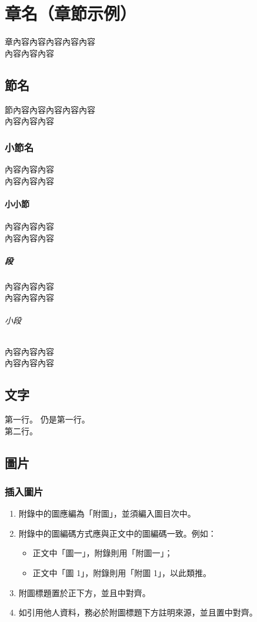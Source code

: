 
\chapter{章名（章節示例）}
章內容內容內容內容內容 \\
內容內容內容

\section{節名}
節內容內容內容內容內容 \\
內容內容內容

\subsection{小節名}
內容內容內容 \\
內容內容內容

\subsubsection{小小節}
內容內容內容 \\
內容內容內容

\paragraph{段}
內容內容內容 \\
內容內容內容

\subparagraph{小段}
內容內容內容 \\
內容內容內容


\section{文字}
第一行。
仍是第一行。 \\
第二行。


\section{圖片}

\subsection{插入圖片}

\begin{enumerate}
    \item 附錄中的圖應編為「附圖」，並須編入圖目次中。    
    \item 附錄中的圖編碼方式應與正文中的圖編碼一致。例如：
    \begin{itemize}
        \item 正文中「圖一」，附錄則用「附圖一」；
        \item 正文中「圖 1」，附錄則用「附圖 1」，以此類推。
    \end{itemize}    
    \item 附圖標題置於正下方，並且中對齊。    
    \item 如引用他人資料，務必於附圖標題下方註明來源，並且置中對齊。
\end{enumerate}

